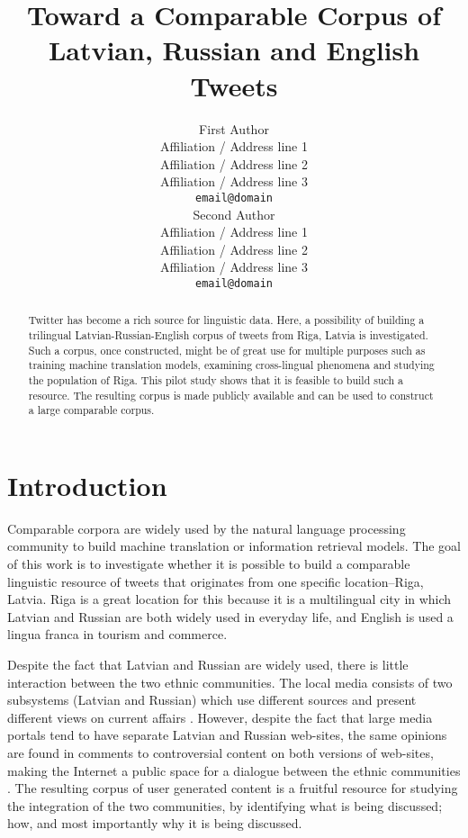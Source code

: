 \documentclass[11pt,a4paper]{article}
\title{Toward a Comparable Corpus of Latvian, Russian and English Tweets}
\author{First Author \\
  Affiliation / Address line 1 \\
  Affiliation / Address line 2 \\
  Affiliation / Address line 3 \\
  {\tt email@domain} \\\And
  Second Author \\
  Affiliation / Address line 1 \\
  Affiliation / Address line 2 \\
  Affiliation / Address line 3 \\
  {\tt email@domain} \\}
\date{}
\begin{document}
\maketitle

\begin{abstract}
Twitter has become a rich source for linguistic data. Here, a possibility of building a trilingual Latvian-Russian-English corpus of tweets from Riga, Latvia is investigated. Such a corpus, once constructed, might be of great use for multiple purposes such as training machine translation models, examining cross-lingual phenomena and studying the population of Riga. This pilot study shows that it is feasible to build such a resource. The resulting corpus is made publicly available and can be used to construct a large comparable corpus.
\end{abstract}

\section{Introduction}
\label{sec:introduction}

Comparable corpora are widely used by the natural language processing community to build machine translation or information retrieval models. The goal of this work is to investigate whether it is possible to build a comparable linguistic resource of tweets that originates from one specific location--Riga, Latvia. Riga is a great location for this because it is a multilingual city in which Latvian and Russian are both widely used in everyday life, and English is used a lingua franca in tourism and commerce.

Despite the fact that Latvian and Russian are widely used, there is little interaction between the two ethnic communities. The local media consists of two subsystems (Latvian and Russian) which use different sources and present different views on current affairs \cite{muiznieks2010}. However, despite the fact that large media portals tend to have separate Latvian and Russian web-sites, the same opinions are found in comments to controversial content on both versions of web-sites, making the Internet a public space for a dialogue  between the ethnic communities \cite{sulmane2010}. The resulting corpus of user generated content is a fruitful resource for studying the integration of the two communities, by identifying what is being discussed; how, and most importantly why it is being discussed.

\end{document}
